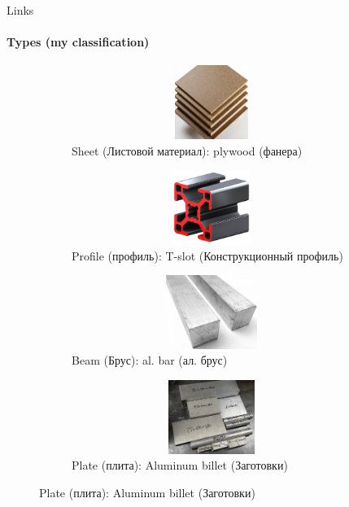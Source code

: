 \documentclass[aspectratio=169]{beamer}
\begin{document}
\begin{frame}[t]{Links}
\framesubtitle{Types (my classification)}
\vspace{-0.7cm}
\begin{figure}[H]
    \begin{subfigure}{0.49\textwidth}
        \centering\includegraphics[height=2.4cm,width=1\textwidth,keepaspectratio]{sheet.jpg}
        \caption*{Sheet (Листовой материал): plywood (фанера)}
        \label{fig:sheet.jpg}
    \end{subfigure}
    \begin{subfigure}{0.49\textwidth}
        \centering\includegraphics[height=2.4cm,width=1\textwidth,keepaspectratio]{tslot.jpg}
        \caption*{Profile (профиль): T-slot (Конструкционный профиль)}
        \label{fig:tslot.jpg}
    \end{subfigure}

    \begin{subfigure}{0.49\textwidth}
        \centering\includegraphics[height=2.4cm,width=1\textwidth,keepaspectratio]{beam.jpg}
        \caption*{Beam (Брус): al. bar (ал. брус)} 
        \label{fig:beam.jpg}
    \end{subfigure}
    \begin{subfigure}{0.49\textwidth}
        \centering\includegraphics[height=2.4cm,width=1\textwidth,keepaspectratio]{cube.jpg}
        \caption*{Plate (плита): Aluminum billet (Заготовки)}
        \label{fig:file_name4}
    \end{subfigure}
\end{figure}
\end{frame}
\end{document}
